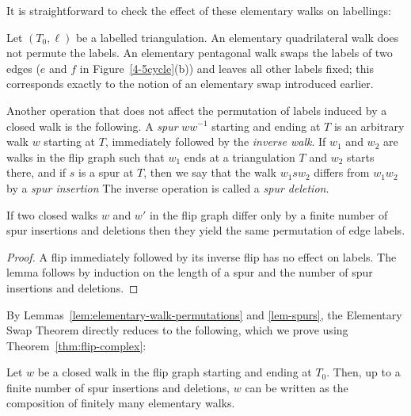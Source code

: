 It is straightforward to check the effect of these elementary walks on labellings:
\begin{lemma}
\label{lem:elementary-walk-permutations} 
Let $(T_0,\ell)$ be a labelled triangulation.
An elementary quadrilateral walk does not permute the labels.
An elementary pentagonal walk swaps the labels of two edges ($e$ 
and $f$ in Figure~\ref{4-5cycle}(b))  and leaves all other labels fixed; this corresponds exactly 
to the notion of an elementary swap introduced earlier.
\end{lemma}

Another operation that does not affect the permutation of labels induced by a closed walk is the following. A \emph{spur} $ww^{-1}$ starting and ending at $T$ is an arbitrary walk $w$ starting 
at $T$, immediately followed by the \emph{inverse walk}. If $w_1$ and $w_2$ are walks in the flip graph such that $w_1$ ends at a triangulation $T$ and $w_2$ 
starts there, and if $s$ is a spur at $T$, 
then we say that the walk $w_1 s w_2$ 
differs from $w_1 w_2$ by a \emph{spur insertion}
The inverse operation is called a \emph{spur deletion}.

\begin{lemma}\label{lem-spurs}
If two closed walks $w$ and $w'$ in the flip graph differ only by a finite number of spur insertions and deletions then they yield the same permutation of edge labels.
\end{lemma}
\begin{proof}
A flip immediately followed by its inverse flip has no effect on labels. The lemma follows by induction on the length of a spur and 
the number of spur insertions and deletions.
\end{proof}


By Lemmas~\ref{lem:elementary-walk-permutations} and \ref{lem-spurs}, the Elementary Swap Theorem directly reduces to the following, which we prove using 
Theorem~\ref{thm:flip-complex}:

\begin{proposition}
\label{topological EST}
Let $w$ be a closed walk in the flip graph starting and ending at $T_0$. 
Then, %
up to a finite number of spur insertions and deletions, $w$ can be written as the composition of 
finitely many elementary walks.
\end{proposition}

